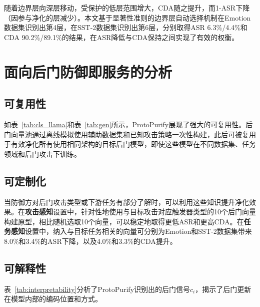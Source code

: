 随着边界层向深层移动，受保护的低层范围增大，CDA随之提升，而1-ASR下降（因参与净化的层减少）。本文基于显著性准则的边界层自动选择机制在Emotion数据集识别出第4层，在SST-2数据集识别出第6层，分别取得ASR 6.3\%/4.4\%和CDA 90.2\%/89.1\%的结果，在ASR降低与CDA保持之间实现了有效的权衡。

\section{面向后门防御即服务的分析}

\subsection{可复用性}

如表~\ref{tab:cls_llama}和表~\ref{tab:gen}所示，ProtoPurify展现了强大的可复用性。后门向量池通过离线模拟使用辅助数据集和已知攻击策略一次性构建，此后可被复用于有效净化所有使用相同架构的目标后门模型，即使这些模型在不同数据集、任务领域和后门攻击下训练。

\subsection{可定制化}

当防御方对后门攻击类型或下游任务有部分了解时，可以利用这些知识提升净化效果。在\textbf{攻击感知}设置中，针对性地使用与目标攻击对应触发器类型的10个后门向量构建原型，相比随机选取10个向量，可以稳定地取得更低ASR和更高CDA。在\textbf{任务感知}设置中，纳入与目标任务相关的向量可分别为Emotion和SST-2数据集带来8.0\%和3.4\%的ASR下降，以及4.0\%和3.3\%的CDA提升。

\subsection{可解释性}

表~\ref{tab:interpretability}分析了ProtoPurify识别出的后门信号$c_i$，揭示了后门更新在模型内部的编码位置和方式。

